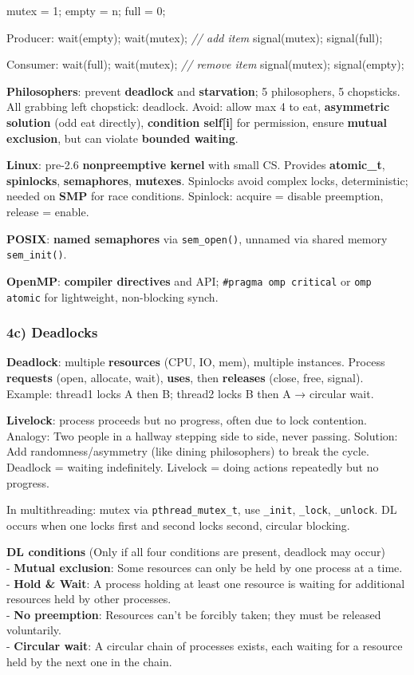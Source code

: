 mutex = 1;
empty = n;
full = 0;

Producer:
wait(empty);
wait(mutex);
\textit{// add item}
signal(mutex);
signal(full);

Consumer:
wait(full);
wait(mutex);
\textit{// remove item}
signal(mutex);
signal(empty);

\textbf{Philosophers}: prevent \textbf{deadlock} and \textbf{starvation}; 5 philosophers, 5 chopsticks. All grabbing left chopstick: deadlock. Avoid: allow max 4 to eat, \textbf{asymmetric solution} (odd eat directly), \textbf{condition self[i]} for permission, ensure \textbf{mutual exclusion}, but can violate \textbf{bounded waiting}.

\textbf{Linux}: pre-2.6 \textbf{nonpreemptive kernel} with small CS. Provides \textbf{atomic\_t}, \textbf{spinlocks}, \textbf{semaphores}, \textbf{mutexes}. Spinlocks avoid complex locks, deterministic; needed on \textbf{SMP} for race conditions. Spinlock: acquire = disable preemption, release = enable.

\textbf{POSIX}: \textbf{named semaphores} via \texttt{sem\_open()}, unnamed via shared memory \texttt{sem\_init()}.

\textbf{OpenMP}: \textbf{compiler directives} and API; \texttt{\#pragma omp critical} or \texttt{omp atomic} for lightweight, non-blocking synch.


\subsubsection*{4c) Deadlocks}
\textbf{Deadlock}: multiple \textbf{resources} (CPU, IO, mem), multiple instances. Process \textbf{requests} (open, allocate, wait), \textbf{uses}, then \textbf{releases} (close, free, signal). 
Example: thread1 locks A then B; thread2 locks B then A → circular wait.

\textbf{Livelock}: process proceeds but no progress, often due to lock contention.
Analogy: Two people in a hallway stepping side to side, never passing.
Solution: Add randomness/asymmetry (like dining philosophers) to break the cycle.
Deadlock = waiting indefinitely. Livelock = doing actions repeatedly but no progress.

In multithreading: mutex via \texttt{pthread\_mutex\_t}, use \texttt{\_init}, \texttt{\_lock}, \texttt{\_unlock}. DL occurs when one locks first and second locks second, circular blocking.

\textbf{DL conditions}
(Only if all four conditions are present, deadlock may occur)\\
- \textbf{Mutual exclusion}: Some resources can only be held by one process at a time.\\
- \textbf{Hold \& Wait}: A process holding at least one resource is waiting for additional resources held by other processes.\\
- \textbf{No preemption}: Resources can't be forcibly taken; they must be released voluntarily.\\
- \textbf{Circular wait}: A circular chain of processes exists, each waiting for a resource held by the next one in the chain.\\

